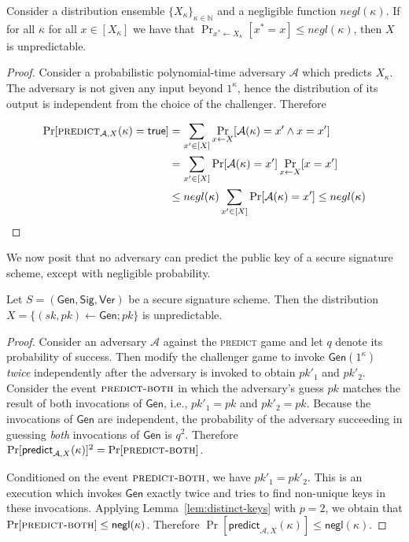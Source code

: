 \begin{lemma}
  Consider a distribution ensemble $\{X_{\kappa}\}_{\kappa\in\mathbb{N}}$ and
  a negligible function $negl(\kappa)$. If for all $\kappa$ for all
  $x \in [X_\kappa]$ we have that
  $\Pr_{x^* \gets X_\kappa}[x^* = x] \leq negl(\kappa)$, then
  $X$ is unpredictable.
\end{lemma}
\begin{proof}
  Consider a probabilistic polynomial-time adversary $\mathcal{A}$ which
  predicts $X_\kappa$. The adversary is not given any input beyond $1^\kappa$,
  hence the distribution of its output is independent from the choice of the
  challenger. Therefore

  \begin{align*}
  \Pr[\textsc{predict}_{\mathcal{A},X}(\kappa) = \mathsf{true}]
  &= \sum_{x' \in [X]}\Pr_{x \gets X}[\mathcal{A}(\kappa) = x'\land x = x']\\
  &= \sum_{x' \in [X]}\Pr[\mathcal{A}(\kappa) = x']\Pr_{x \gets X}[x = x']\\
  &\leq negl(\kappa)\sum_{x' \in [X]}\Pr[\mathcal{A}(\kappa) = x']
  \leq negl(\kappa)\\
  \end{align*}
\end{proof}

We now posit that no adversary can predict the public key of a secure signature scheme, except with negligible probability.

\begin{lemma}\label{lem:pk-unpredictability}
  Let $S = (\textsf{Gen}, \textsf{Sig}, \textsf{Ver})$ be a secure signature scheme.
  Then the distribution $X = \{(sk, pk) \gets \textsf{Gen}; pk\}$ is
  unpredictable.
\end{lemma}
\begin{proof}
  Consider an adversary $\mathcal{A}$ against the \textsc{predict} game and let $q$ denote its probability of success. Then modify the challenger game to invoke $\textsf{Gen}(1^\kappa)$ \emph{twice} independently after the adversary is invoked to obtain $pk'_1$ and $pk'_2$. Consider the event $\textsc{predict-both}$ in which the adversary's guess $pk$ matches the result of both invocations of $\textsf{Gen}$, i.e., $pk'_1 = pk$ and $pk'_2 = pk$.
  Because the invocations of $\textsf{Gen}$ are independent, the probability of the adversary succeeding in guessing \emph{both} invocations of $\textsf{Gen}$ is $q^2$. Therefore
  $
  \Pr[\textsf{predict}_{\mathcal{A},X}(\kappa)]^2 = \Pr[\textsc{predict-both}]
  $.

  Conditioned on the event $\textsc{predict-both}$, we have $pk'_1 = pk'_2$. This is an execution which invokes $\textsf{Gen}$ exactly twice and tries to find non-unique keys in these invocations. Applying Lemma~\ref{lem:distinct-keys} with $p = 2$, we obtain that
  $
  \Pr[\textsc{predict-both}] \leq \textsf{negl}(\kappa)
  $.
  Therefore
  $
  \Pr[\textsf{predict}_{\mathcal{A},X}(\kappa)] \leq \textsf{negl}(\kappa)
  $.
\end{proof}


